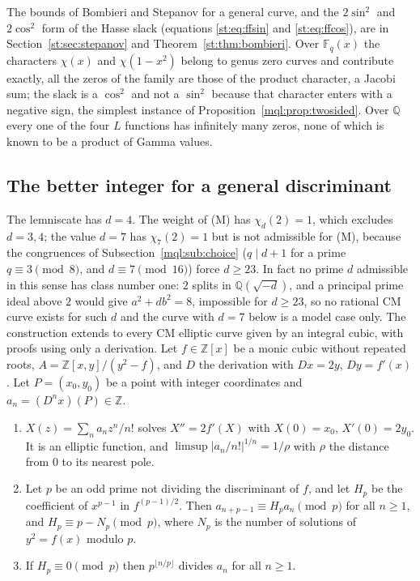 The bounds of Bombieri and Stepanov for a general curve, and the $2\sin^2$ and $2\cos^2$ form of the Hasse slack (equations \eqref{st:eq:ffsin} and \eqref{st:eq:ffcos}), are in Section~\ref{st:sec:stepanov} and Theorem~\ref{st:thm:bombieri}. Over $\mathbb F_q(x)$ the characters $\chi(x)$ and $\chi(1-x^2)$ belong to genus zero curves and contribute exactly, all the zeros of the family are those of the product character, a Jacobi sum; the slack is a $\cos^2$ and not a $\sin^2$ because that character enters with a negative sign, the simplest instance of Proposition~\ref{mql:prop:twosided}. Over $\mathbb Q$ every one of the four $L$ functions has infinitely many zeros, none of which is known to be a product of Gamma values.

\subsection{The better integer for a general discriminant}\label{mql:sub:general}

The lemniscate has $d=4$. The weight of (M) has $\chi_d(2)=1$, which excludes $d=3,4$; the value $d=7$ has $\chi_7(2)=1$ but is not admissible for (M), because the congruences of Subsection~\ref{mql:sub:choice} ($q\mid d+1$ for a prime $q\equiv3\pmod8$, and $d\equiv7\pmod{16}$) force $d\ge23$. In fact no prime $d$ admissible in this sense has class number one: $2$ splits in $\mathbb Q(\sqrt{-d})$, and a principal prime ideal above $2$ would give $a^2+db^2=8$, impossible for $d\ge23$, so no rational CM curve exists for such $d$ and the curve with $d=7$ below is a model case only. The construction extends to every CM elliptic curve given by an integral cubic, with proofs using only a derivation. Let $f\in\mathbb Z[x]$ be a monic cubic without repeated roots, $A=\mathbb Z[x,y]/(y^2-f)$, and $D$ the derivation with $Dx=2y$, $Dy=f'(x)$. Let $P=(x_0,y_0)$ be a point with integer coordinates and $a_n=(D^nx)(P)\in\mathbb Z$.

\begin{theorem}\label{mql:thm:general}
\begin{enumerate}
\item $X(z)=\sum_na_nz^n/n!$ solves $X''=2f'(X)$ with $X(0)=x_0$, $X'(0)=2y_0$. It is an elliptic function, and $\limsup|a_n/n!|^{1/n}=1/\rho$ with $\rho$ the distance from $0$ to its nearest pole.
\item Let $p$ be an odd prime not dividing the discriminant of $f$, and let $H_p$ be the coefficient of $x^{p-1}$ in $f^{(p-1)/2}$. Then $a_{n+p-1}\equiv H_pa_n\pmod p$ for all $n\ge1$, and $H_p\equiv p-N_p\pmod p$, where $N_p$ is the number of solutions of $y^2=f(x)$ modulo $p$.
\item If $H_p\equiv0\pmod p$ then $p^{\lfloor n/p\rfloor}$ divides $a_n$ for all $n\ge1$.
\end{enumerate}
\end{theorem}

